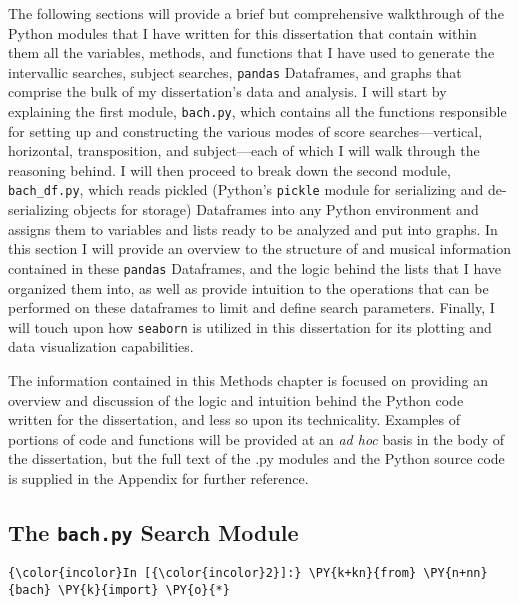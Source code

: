 The following sections will provide a brief but comprehensive
walkthrough of the Python modules that I have written for this
dissertation that contain within them all the variables, methods, and
functions that I have used to generate the intervallic searches, subject
searches, \texttt{pandas} Dataframes, and graphs that comprise the bulk
of my dissertation's data and analysis. I will start by explaining the
first module, \texttt{bach.py}, which contains all the functions
responsible for setting up and constructing the various modes of score
searches---vertical, horizontal, transposition, and
subject---each of which I will walk through the reasoning behind. I
will then proceed to break down the second module, \texttt{bach\_df.py},
which reads pickled (Python's \texttt{pickle} module for serializing and
de-serializing objects for storage) Dataframes into any Python
environment and assigns them to variables and lists ready to be analyzed
and put into graphs. In this section I will provide an overview to the
structure of and musical information contained in these \texttt{pandas}
Dataframes, and the logic behind the lists that I have organized them
into, as well as provide intuition to the operations that can be
performed on these dataframes to limit and define search parameters.
Finally, I will touch upon how \texttt{seaborn} is utilized in this
dissertation for its plotting and data visualization capabilities.

The information contained in this Methods chapter is focused on
providing an overview and discussion of the logic and intuition behind
the Python code written for the dissertation, and less so upon its
technicality. Examples of portions of code and functions will be
provided at an \emph{ad hoc} basis in the body of the dissertation, but
the full text of the .py modules and the Python source code is supplied
in the Appendix for further reference.

    \subsection{\texorpdfstring{The \texttt{bach.py} Search
Module}{The bach.py Search Module}}\label{the-bach.py-search-module}

    \begin{Verbatim}[commandchars=\\\{\}]
{\color{incolor}In [{\color{incolor}2}]:} \PY{k+kn}{from} \PY{n+nn}{bach} \PY{k}{import} \PY{o}{*}
\end{Verbatim}

